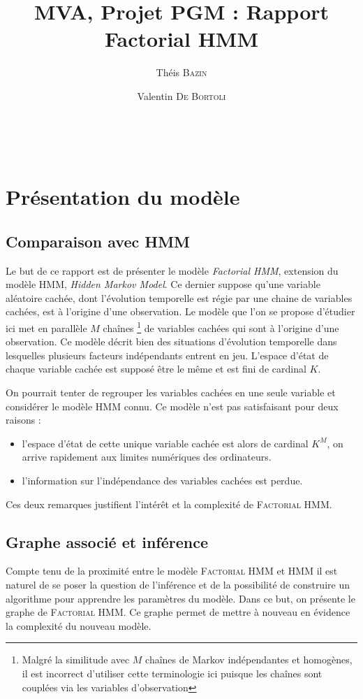 \documentclass[10pt,a4paper]{article}
\title{MVA, Projet PGM : Rapport\\
  Factorial HMM}
\author{Théis \textsc{Bazin} \and Valentin \textsc{De Bortoli}}
\newcommand{\hmm}{\textsc{HMM}}
\newcommand{\fhmm}{\textsc{Factorial HMM}}
\begin{document}
\maketitle
\tableofcontents

~
\newpage

\section{Présentation du modèle}
\subsection{Comparaison avec HMM}
Le but de ce rapport est de présenter le modèle \emph{Factorial HMM}, extension 
du modèle \hmm, \emph{Hidden Markov Model}. Ce dernier suppose qu'une variable 
aléatoire cachée, dont l'évolution temporelle est régie par une chaine de variables
cachées, est à l'origine d'une observation. Le modèle que l'on se 
propose d'étudier ici met en parallèle $M$ chaînes \footnote{Malgré la 
similitude avec $M$ chaînes de Markov indépendantes et homogènes, il est incorrect
d'utiliser cette terminologie ici puisque les chaînes sont couplées via les variables
d'observation} de variables cachées
 qui sont à l'origine d'une observation. Ce modèle décrit bien
des situations d'évolution temporelle dans lesquelles plusieurs facteurs 
indépendants entrent en jeu.
L'espace d'état de chaque variable cachée est  supposé être le même et est fini
de cardinal $K$.

On pourrait tenter de regrouper les variables cachées en une seule variable et
considérer le modèle  \hmm{} connu.
Ce modèle n'est pas satisfaisant pour deux raisons :

\begin{itemize}
  \item l'espace d'état de cette unique variable cachée est alors de cardinal 
    $K^M$, on arrive rapidement aux limites numériques des ordinateurs.
  \item l'information sur l'indépendance des variables cachées est perdue.
\end{itemize}

Ces deux remarques justifient l'intérêt et la complexité de \fhmm.

\subsection{Graphe associé et inférence} 
Compte tenu de la proximité entre le modèle \fhmm{} et \hmm{} il est naturel de 
se poser la question de l'inférence et de la possibilité de construire un
algorithme pour apprendre les paramètres du modèle.
Dans ce but, on présente le graphe de \fhmm.
Ce graphe permet de mettre à nouveau en évidence la complexité du nouveau 
modèle.
\end{document}
